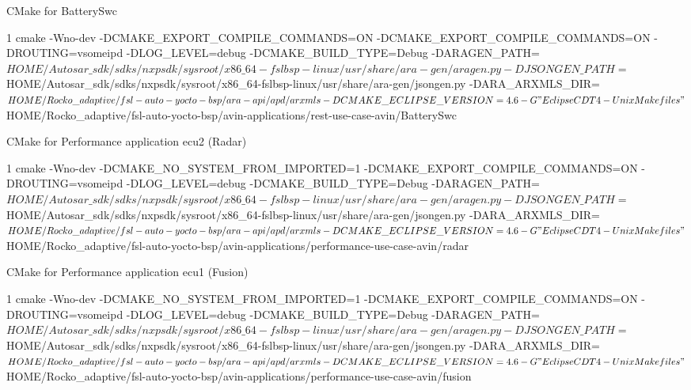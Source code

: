 \begin{DoxyItemize}
\item C\+Make for Battery\+Swc 
\begin{DoxyCode}
1 cmake -Wno-dev -DCMAKE\_EXPORT\_COMPILE\_COMMANDS=ON -DCMAKE\_EXPORT\_COMPILE\_COMMANDS=ON -DROUTING=vsomeipd 
       -DLOG\_LEVEL=debug -DCMAKE\_BUILD\_TYPE=Debug
       -DARAGEN\_PATH=$HOME/Autosar\_sdk/sdks/nxpsdk/sysroot/x86\_64-fslbsp-linux/usr/share/ara-gen/aragen.py 
       -DJSONGEN\_PATH=$HOME/Autosar\_sdk/sdks/nxpsdk/sysroot/x86\_64-fslbsp-linux/usr/share/ara-gen/jsongen.py -DARA\_ARXMLS\_DIR=$HOME/Rocko\_adaptive/fsl-auto-yocto-bsp/ara-api/apd/arxmls
       -DCMAKE\_ECLIPSE\_VERSION=4.6 -G"Eclipse CDT4 - Unix Makefiles"
       $HOME/Rocko\_adaptive/fsl-auto-yocto-bsp/avin-applications/rest-use-case-avin/BatterySwc
\end{DoxyCode}

\item C\+Make for Performance application ecu2 (Radar) 
\begin{DoxyCode}
1 cmake -Wno-dev -DCMAKE\_NO\_SYSTEM\_FROM\_IMPORTED=1 -DCMAKE\_EXPORT\_COMPILE\_COMMANDS=ON -DROUTING=vsomeipd 
       -DLOG\_LEVEL=debug -DCMAKE\_BUILD\_TYPE=Debug
       -DARAGEN\_PATH=$HOME/Autosar\_sdk/sdks/nxpsdk/sysroot/x86\_64-fslbsp-linux/usr/share/ara-gen/aragen.py 
       -DJSONGEN\_PATH=$HOME/Autosar\_sdk/sdks/nxpsdk/sysroot/x86\_64-fslbsp-linux/usr/share/ara-gen/jsongen.py -DARA\_ARXMLS\_DIR=$HOME/Rocko\_adaptive/fsl-auto-yocto-bsp/ara-api/apd/arxmls
       -DCMAKE\_ECLIPSE\_VERSION=4.6 -G"Eclipse CDT4 - Unix Makefiles"
       $HOME/Rocko\_adaptive/fsl-auto-yocto-bsp/avin-applications/performance-use-case-avin/radar
\end{DoxyCode}

\item C\+Make for Performance application ecu1 (Fusion) 
\begin{DoxyCode}
1 cmake -Wno-dev -DCMAKE\_NO\_SYSTEM\_FROM\_IMPORTED=1 -DCMAKE\_EXPORT\_COMPILE\_COMMANDS=ON -DROUTING=vsomeipd 
       -DLOG\_LEVEL=debug -DCMAKE\_BUILD\_TYPE=Debug
       -DARAGEN\_PATH=$HOME/Autosar\_sdk/sdks/nxpsdk/sysroot/x86\_64-fslbsp-linux/usr/share/ara-gen/aragen.py 
       -DJSONGEN\_PATH=$HOME/Autosar\_sdk/sdks/nxpsdk/sysroot/x86\_64-fslbsp-linux/usr/share/ara-gen/jsongen.py -DARA\_ARXMLS\_DIR=$HOME/Rocko\_adaptive/fsl-auto-yocto-bsp/ara-api/apd/arxmls
       -DCMAKE\_ECLIPSE\_VERSION=4.6 -G"Eclipse CDT4 - Unix Makefiles"
       $HOME/Rocko\_adaptive/fsl-auto-yocto-bsp/avin-applications/performance-use-case-avin/fusion
\end{DoxyCode}


\end{DoxyItemize}
